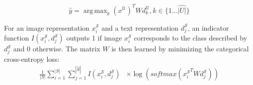 \documentclass[11pt,a4paper]{article}
\DeclareMathOperator*{\argmax}{arg\,max}
\newcommand\gal[1]{\textcolor{bright}{\textbf{GAL:} #1 }}
\newcommand\yuval[1]{\textcolor{darkpink}{\textbf{YUVAL:} #1 }}
\newcommand\tzuf[1]{\textcolor{blue}{\textbf{TZUF:} #1 }}
\begin{document}

\begin{equation}
    \label{equation:attention}
    {\hat{y}}=\argmax_{k} \left( x^{\mathcal{U}} \right) ^{T}Wd^{\mathcal{U}}_{k}, k \in \{1 \dots \hat{|U|}\}
\end{equation}

For an image representation $x^{\mathcal{S}}_i$ and a text representation $d^{\mathcal{S}}_j$, an indicator function $I(x^{\mathcal{S}}_i,d^{\mathcal{S}}_j)$  outputs 1 if image $x^{\mathcal{S}}_i$ corresponds to the class described by $d^{\mathcal{S}}_j$ and 0 otherwise. 
The matrix $W$ is then learned by minimizing the categorical cross-entropy loss: 
\begin{equation}
\begin{split}
    \frac{1}{|S|}\sum_{i=1}^{|S|}\sum_{j=1}^{|\hat{S}|}I(x^{\mathcal{S}}_i,d^{\mathcal{S}}_j) 
    &\times\log(\textit{softmax}({x^{\mathcal{S}}_i}^TWd^{\mathcal{S}}_j))
\end{split}
\end{equation}
\end{document}
